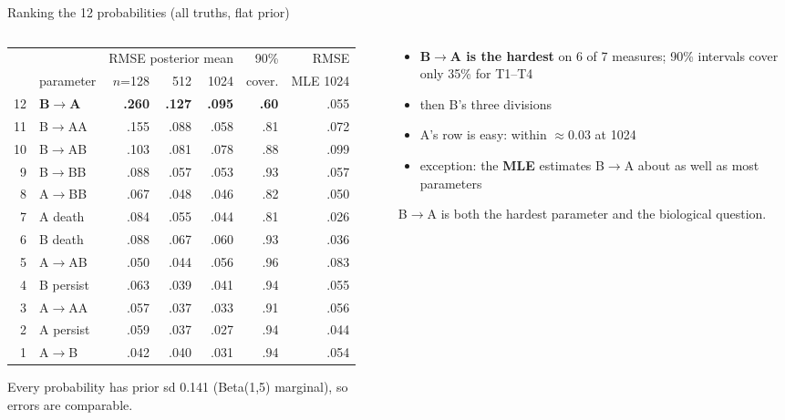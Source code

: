 \documentclass[aspectratio=169,11pt]{beamer}
\newcommand{\BA}{B$\to$A}
\newcommand{\take}[1]{\begin{block}{}\small #1\end{block}}
\begin{document}
\begin{frame}{Ranking the 12 probabilities (all truths, flat prior)}
\begin{columns}[c]
\begin{column}{0.58\textwidth}
{\scriptsize\setlength{\tabcolsep}{3.5pt}
\begin{tabular}{@{}rlrrrrr@{}}\toprule
 & & \multicolumn{3}{c}{RMSE posterior mean} & 90\% & RMSE \\
 & parameter & $n$=128 & 512 & 1024 & cover. & MLE 1024 \\\midrule
12 & \alert{\textbf{B$\to$A}} & \textbf{.260} & \textbf{.127} & \textbf{.095} & \textbf{.60} & .055 \\
11 & B$\to$AA & .155 & .088 & .058 & .81 & .072 \\
10 & B$\to$AB & .103 & .081 & .078 & .88 & .099 \\
9 & B$\to$BB & .088 & .057 & .053 & .93 & .057 \\
8 & A$\to$BB & .067 & .048 & .046 & .82 & .050 \\
7 & A death & .084 & .055 & .044 & .81 & .026 \\
6 & B death & .088 & .067 & .060 & .93 & .036 \\
5 & A$\to$AB & .050 & .044 & .056 & .96 & .083 \\
4 & B persist & .063 & .039 & .041 & .94 & .055 \\
3 & A$\to$AA & .057 & .037 & .033 & .91 & .056 \\
2 & A persist & .059 & .037 & .027 & .94 & .044 \\
1 & A$\to$B & .042 & .040 & .031 & .94 & .054 \\\bottomrule
\end{tabular}}

{\tiny Every probability has prior sd 0.141 (Beta(1,5) marginal), so errors are comparable.}
\end{column}
\begin{column}{0.40\textwidth}\small
\begin{itemize}
\item \textbf{\BA{} is the hardest} on 6 of 7 measures; 90\% intervals cover only 35\% for T1--T4
\item then B's three divisions
\item A's row is easy: within $\approx 0.03$ at 1024
\item exception: the \textbf{MLE} estimates \BA{} about as well as most parameters
\end{itemize}
\take{\BA{} is both the hardest parameter and the biological question.}
\end{column}
\end{columns}
\end{frame}
\end{document}
